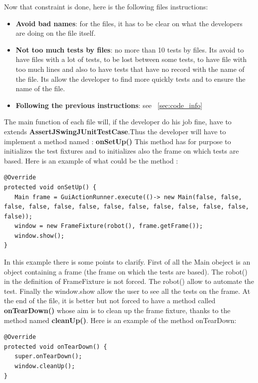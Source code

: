 \documentclass[12pt]{article}
\begin{document}
Now that constraint is done, here is the following files instructions:

\begin{itemize}
  \item \textbf{Avoid bad names}: for the files, it has to be clear on what the developers are doing on the file itself.
  \item \textbf{Not too much tests by files}: no more than 10 tests by files. Its avoid to have files with a lot of tests, to be lost between some tests, to have file with too much lines and also to have tests that have no record with the name of the file. Its allow the developer to find more quickly tests and to ensure the name of the file.
  \item \textbf{Following the previous instructions}: see ~\ref{sec:code_info}
\end{itemize}

The main function of each file will, if the developer do his job fine, have to extends \textbf{AssertJSwingJUnitTestCase}.Thus the developer will have to implement a method named : \textbf{onSetUp()} \newline
This method has for purpose to initializes the test fixtures and to initializes also the frame on which tests are based. Here is an example of what could be the method :

\begin{verbatim}
@Override
protected void onSetUp() {
   Main frame = GuiActionRunner.execute(()-> new Main(false, false, false, false, false, false, false, false, false, false, false, false, false));
   window = new FrameFixture(robot(), frame.getFrame());
   window.show();
}
\end{verbatim}

In this example there is some points to clarify. First of all the Main obeject is an object containing a frame (the frame on which the tests are based). The robot() in the definition of FrameFixture is not forced. The robot() allow to automate the test. Finally the window.show allow the user to see all the tests on the frame.\newline
At the end of the file, it is better but not forced to have a method called \textbf{onTearDown()} whose aim is to clean up the frame fixture, thanks to the method named \textbf{cleanUp()}.
Here is an example of the method onTearDown:

\begin{verbatim}
@Override
protected void onTearDown() {
   super.onTearDown();
   window.cleanUp();
}
\end{verbatim}
\end{document}
